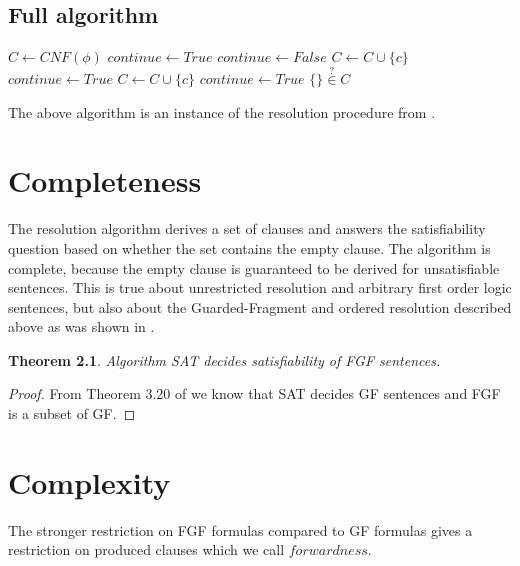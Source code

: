 \documentclass[english, shortabstract]{iithesis}
\theoremstyle{definition} \newtheorem{definition}{Definition}[chapter]
\theoremstyle{remark} \newtheorem{remark}[definition]{Observation}
\theoremstyle{plain} \newtheorem{theorem}[definition]{Theorem}
\theoremstyle{plain} \newtheorem{lemma}[definition]{Lemma}
\begin{document}
\section{Full algorithm}

\begin{algorithm}
\begin{algorithmic}
\State $C \gets CNF(\phi)$
\State $continue \gets True$
\State $continue \gets False$
    \State $C \gets C \cup \{c\}$
    \State $continue \gets True$
\EndIf
{}
    \State $C \gets C \cup \{c\}$
    \State $continue \gets True$
\EndIf
\EndFor
\EndWhile
\State
\Return $\{\} \stackrel{?}{\in} C$
\EndProcedure
\end{algorithmic}
\end{algorithm}

The above algorithm is an instance of the resolution procedure from \cite{resolution GF}.

\chapter{Completeness}

The resolution algorithm derives a set of clauses and answers the satisfiability question 
based on whether the set contains the empty clause. The algorithm is complete, because 
the empty clause is guaranteed to be derived for unsatisfiable sentences.
This is true about unrestricted resolution and arbitrary first order logic sentences, 
but also about the Guarded-Fragment and ordered resolution described above as was shown in \cite{resolution gf}.

\begin{theorem}
Algorithm SAT decides satisfiability of FGF sentences.
\end{theorem}

\begin{proof}
From Theorem 3.20 of \cite{resolution gf} we know that SAT decides GF sentences and FGF is a subset of GF.
\end{proof}

\chapter{Complexity}

The stronger restriction on FGF formulas compared to GF formulas gives a restriction on produced clauses which we call $forwardness$.
\end{document}
